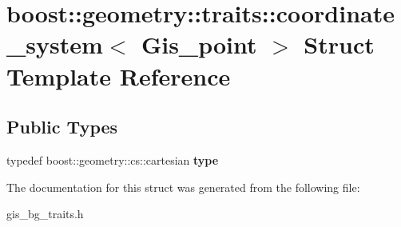 \hypertarget{structboost_1_1geometry_1_1traits_1_1coordinate__system_3_01Gis__point_01_4}{}\section{boost\+:\+:geometry\+:\+:traits\+:\+:coordinate\+\_\+system$<$ Gis\+\_\+point $>$ Struct Template Reference}
\label{structboost_1_1geometry_1_1traits_1_1coordinate__system_3_01Gis__point_01_4}
\subsection*{Public Types}
\begin{DoxyCompactItemize}
\item 
\mbox{\label{structboost_1_1geometry_1_1traits_1_1coordinate__system_3_01Gis__point_01_4_a0e13a7416d2dd654766aae167f2b4a5f}} 
typedef boost\+::geometry\+::cs\+::cartesian {\bfseries type}
\end{DoxyCompactItemize}


The documentation for this struct was generated from the following file\+:\begin{DoxyCompactItemize}
\item 
gis\+\_\+bg\+\_\+traits.\+h\end{DoxyCompactItemize}
